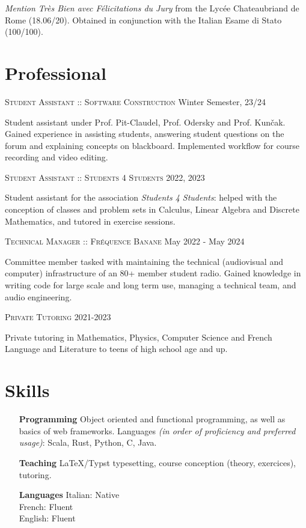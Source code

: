 \documentclass[10pt]{article}
\renewcommand{\line}[2]{{\vspace{4pt} \large \noindent\textsc{#1} \hfill #2}\vspace{4pt}}
\begin{document}
  \textit{Mention Très Bien avec Félicitations du Jury} from the Lycée Chateaubriand de Rome (18.06/20). Obtained in conjunction with the Italian Esame di Stato (100/100).
  
  \section*{Professional}

  \line{Student Assistant :: Software Construction}{Winter Semester, 23/24}

  Student assistant under Prof. Pit-Claudel, Prof. Odersky and Prof. Kunčak. Gained experience in assisting students, answering student questions on the forum and explaining concepts on blackboard. Implemented workflow for course recording and video editing.

  \line{Student Assistant :: Students 4 Students}{2022, 2023}

  Student assistant for the association \textit{Students 4 Students}: helped with the conception of classes and problem sets in Calculus, Linear Algebra and Discrete Mathematics, and tutored in exercise sessions.

  \line{Technical Manager :: Fréquence Banane}{May 2022 - May 2024}

  Committee member tasked with maintaining the technical (audiovisual and computer) infrastructure of an 80+ member student radio. Gained knowledge in writing code for large scale and long term use, managing a technical team, and audio engineering.

  \line{Private Tutoring}{2021-2023}

  Private tutoring in Mathematics, Physics, Computer Science and French Language and Literature to teens of high school age and up.

  \section*{Skills}
  
  \begin{adjustwidth}{1in}{}
    \begin{itemize}
      \item[\textbf{Programming}] Object oriented and functional programming, as well as basics of web frameworks. Languages \textit{(in order of proficiency and preferred usage)}: Scala, Rust, Python, C, Java. 
      \item[\textbf{Teaching}] LaTeX/Typst typesetting, course conception (theory, exercices), tutoring.
      \item[\textbf{Languages}] Italian: Native \\ French: Fluent \\ English: Fluent
    \end{itemize}
  \end{adjustwidth}
\end{document}

